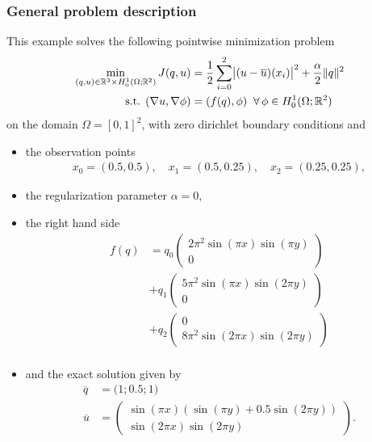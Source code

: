 \subsubsection{General problem description}
This example solves the following pointwise minimization problem
\begin{align*}
\min_{(q,u)\in \mathbb R^3 \times H_0^1(\Omega; \mathbb R^2)} J(q,u) &= \frac{1}{2} \sum_{i=0}^2\abs{(u-\overline u)(x_i)}^2 + \frac{\alpha}{2}\|q\|^2\\
\text{s.t. } (\nabla u,\nabla \phi) &= (f(q),\phi)\;\;\forall\,\phi \in H^1_0(\Omega; \mathbb R^2)
\end{align*}
on the domain $\Omega = [0,1]^2$, with zero dirichlet boundary conditions and
\begin{itemize}
\item the observation points
\begin{align*}
x_0 = (0.5, 0.5), \quad x_1 = (0.5, 0.25),\quad x_2 = (0.25, 0.25),
\end{align*}
\item the regularization parameter $\alpha = 0$, 
\item the right hand side
\begin{align*}
 f(q) &= q_0 \left(\begin{matrix}2\pi^2  \sin( \pi x) \sin(\pi y)\\0 \end{matrix}\right)\\
      &+ q_1 \left(\begin{matrix}5\pi^2  \sin( \pi x) \sin(2\pi y)\\0 \end{matrix}\right)\\
      &+ q_2 \left(\begin{matrix}0 \\8\pi^2  \sin(2\pi x) \sin(2\pi y)\end{matrix}\right)\\
\end{align*}
\item and the exact solution given by 
\begin{align*}
 \overline{q} &= \bigl(1;0.5;1\bigr)\\
 \overline{u}& = \left(\begin{matrix} \sin( \pi x)( \sin(\pi y)+0.5\sin(2\pi y))\\\sin(2\pi x) \sin(2\pi y) \end{matrix}\right).
\end{align*}
\end{itemize}
